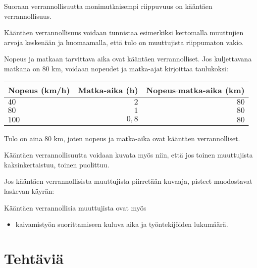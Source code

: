 Suoraan verrannollisuutta monimutkaisempi riippuvuus on kääntäen
verrannollisuus.


Kääntäen verrannollisuus voidaan tunnistaa esimerkiksi
kertomalla muuttujien arvoja keskenään ja huomaamalla,
että tulo on muuttujista riippumaton vakio.

\begin{esimerkki}
Nopeus ja matkaan tarvittava aika ovat kääntäen verrannolliset.
Jos kuljettavana matkana on $80$ km, voidaan nopeudet ja matka-ajat
kirjoittaa taulukoksi:
\begin{center} 
\begin{tabular}{|l|r|r|}
\hline
Nopeus (km/h) & Matka-aika (h) & Nopeus$\cdot$matka-aika (km) \\
\hline
$40$ & $2$ & $80$ \\
$80$ & $1$ & $80$ \\
$100$ & $0,8$ & $80$ \\
\hline
\end{tabular}
\end{center}
Tulo on aina $80$ km, joten nopeus ja matka-aika ovat kääntäen verrannolliset.
\end{esimerkki}

Kääntäen verrannollisuutta voidaan kuvata myös niin, että jos
toinen muuttujista kaksinkertaistuu, toinen puolittuu.

Jos kääntäen verrannollisista muuttujista piirretään kuvaaja, pisteet
muodostavat laskevan käyrän:


Kääntäen verrannollisia muuttujista ovat myös
\begin{itemize}
    \item kaivamistyön suorittamiseen kuluva aika ja työntekijöiden lukumäärä.
\end{itemize}

\section*{Tehtäviä}

